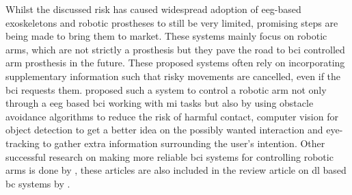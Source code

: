 Whilst the discussed risk has caused widespread adoption of \gls{eeg}-based exoskeletons and robotic prostheses to still be very limited, promising steps are being made to bring them to market.
These systems mainly focus on robotic arms, which are not strictly a prosthesis but they pave the road to \gls{bci} controlled arm prosthesis in the future.
These proposed systems often rely on incorporating supplementary information such that risky movements are cancelled, even if the \gls{bci} requests them. 
 proposed such a system to control a robotic arm not only through a \gls{eeg} based \gls{bci} working with \gls{mi} tasks but also by using obstacle avoidance algorithms to reduce the risk of harmful contact, computer vision for object detection to get a better idea on the possibly wanted interaction and eye-tracking to gather extra information surrounding the user's intention.
Other successful research on making more reliable \gls{bci} systems for controlling robotic arms is done by \citet{eeg_robot_arm1, eeg_robot_arm2, eeg_robot_arm3, eeg_robot_arm4}, these articles are also included in the review article on \gls{dl} based \gls{bc} systems by \citet{bci_review_arnau}.

